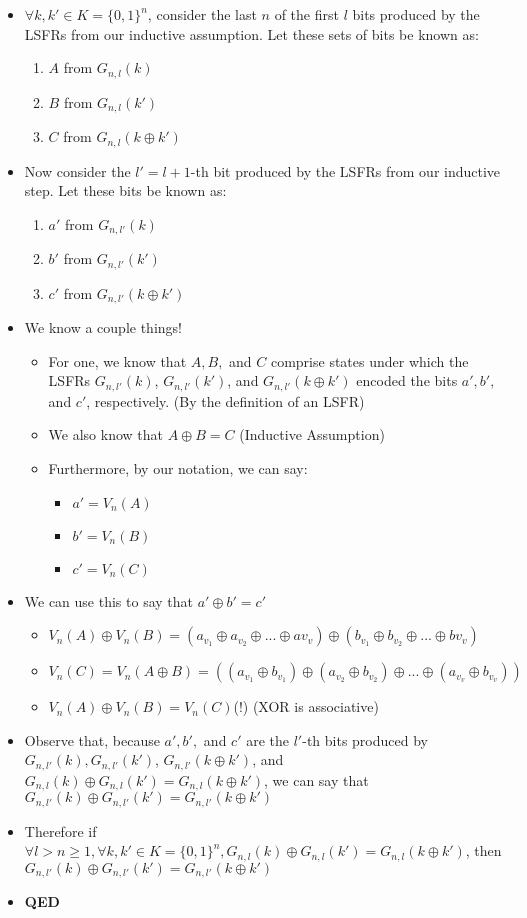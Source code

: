 \documentclass[]{article}
\begin{document}
\begin{itemize}
	\item $\forall k, k' \in K = \{0,1\}^n$, consider the last $n$ of the first $l$ bits produced by the LSFRs from our inductive assumption. Let these sets of bits be known as:
	\begin{enumerate}
		\item $A$ from $G_{n,l}(k)$
		\item $B$ from $G_{n,l}(k')$
		\item $C$ from $G_{n,l}(k \oplus k')$
	\end{enumerate}
	\item Now consider the $l' = l + 1$-th bit produced by the LSFRs from our inductive step. Let these bits be known as:
	\begin{enumerate}
		\item $a'$ from $G_{n,l'}(k)$		
		\item $b'$ from $G_{n,l'}(k')$
		\item $c'$ from $G_{n,l'}(k \oplus k')$
	\end{enumerate}
	\item We know a couple things! 
	\begin{itemize}
		\item For one, we know that $A,B,$ and $C$ comprise states under which the LSFRs $G_{n,l'}(k)$, $G_{n,l'}(k')$, and $G_{n,l'}(k \oplus k')$ encoded the bits $a', b', $and $c'$, respectively. (By the definition of an LSFR)
		\item We also know that $A \oplus B = C$ (Inductive Assumption)
		\item Furthermore, by our notation, we can say:
		\begin{itemize}
			\item $a' = V_n(A)$
			\item $b' = V_n(B)$
			\item $c' = V_n(C)$
		\end{itemize}
	\end{itemize}
	\item We can use this to say that $a' \oplus b' = c'$
	\begin{itemize}
		\item $V_n(A) \oplus V_n(B) = (a_{v_1} \oplus a_{v_2} \oplus ... \oplus a{v_v}) \oplus (b_{v_1} \oplus b_{v_2} \oplus ... \oplus b{v_v})$
		\item $V_n(C) = V_n(A \oplus B) = ((a_{v_1} \oplus b_{v_1}) \oplus (a_{v_2} \oplus b_{v_2}) \oplus ... \oplus (a_{v_v} \oplus b_{v_v}))$
		\item $V_n(A) \oplus V_n(B) = V_n(C)$(!) (XOR is associative)
	\end{itemize}
	\item Observe that, because $a', b',$ and $c'$ are the $l'$-th bits produced by $G_{n,l'}(k), G_{n,l'}(k')$, $G_{n,l'}(k \oplus k')$, and $G_{n,l}(k) \oplus G_{n,l}(k') = G_{n,l}(k \oplus k')$, we can say that $G_{n,l'}(k) \oplus G_{n,l'}(k') = G_{n,l'}(k \oplus k')$
	\item Therefore if $\forall l > n \geq 1,  \forall k, k' \in K = \{0,1\}^n, G_{n,l}(k) \oplus G_{n,l}(k') = G_{n,l}(k \oplus k')$, then $G_{n,l'}(k) \oplus G_{n,l'}(k') = G_{n,l'}(k \oplus k')$
	\item  \textbf{QED}
\end{itemize}
\end{document}
